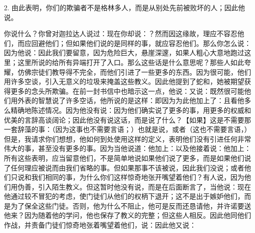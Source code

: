 2. 由此表明，你们的欺骗者不是格林多人，而是从别处先前被败坏的人；因此他说。\par

你说什么？你曾对迦拉达人说过：现在你却说：？然而因这缘故，理应不容忍他们，而应回避他们；但如果他们说的是同样的事，就应容忍他们。那么你怎么说：因为他说：因此我们要留意，因为危险巨大，悬崖深邃，如果人粗心大意地跑过这里；这里所说的给所有异端打开了入口。那么这些话是什么意思呢？那些人如此夸耀，仿佛宗徒们教导得不完全，而他们引进了一些更多的东西。因为很可能，他们用许多空谈，引入无意义的垃圾来掩盖这些教义。因此他提到了蛇和，她被期望获得更多的念头所欺骗。在前一封书信中也暗示这一点，他说：又说：既然很可能他们用外表的智慧说了许多空话，他所说的是这样：即因为为此他加上了：且看他多么精确地陈述情况。因为他没有说：因为他们确实说了更多的事，用更多的权威和优美的言辞高谈阔论；因此他没有说这话，而是说了什么？【如果】这是不需要那一套辞藻的事：（因为这事也不需要言语；）也就是说，或者（这也不需要言语，）但是，我请求你们想想，他如何到处使用这样的定义，表明他们没有引进任何非常伟大的事，甚至没有更多的事。因为当他说道：他加上：以及他接着说：他加上：所有这些表明，应当留意他们，不是简单地说如果他们说了更多，而是如果他们说了任何理应被说而由我们省略的事。但如果那事不该被说，因此我们没说；或者他们只说和我们相同的事，为什么你们这样惊奇地张开嘴望着他们？有人说，因为他们用伪善，引入陌生教义。但这暂时他没有说，而是在后面断言了，当他说：现在他通过较不冒犯的考虑，使门徒们从他们的权柄下退开；这不是出于嫉妒他们，而是为了保全这些门徒。否则，他为什么不阻止，他可是反而还恳请他，并许诺要送他来？因为随着他的学问，他也保存了教义的完整；但这些人相反。因此他同他们作战，并责备门徒们惊奇地张着嘴望着他们，说：因此他又说：\par

